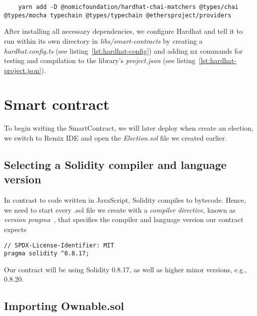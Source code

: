 \begin{verbatim}
    yarn add -D @nomicfoundation/hardhat-chai-matchers @types/chai @types/mocha typechain @types/typechain @ethersproject/providers
\end{verbatim}

After installing all necessary dependencies, we configure Hardhat and tell it to run within its own directory in \emph{libs/smart-contracts} by creating a \emph{hardhat.config.ts} (see listing~\ref{lst:hardhat-config}) and adding nx commands for testing and compilation to the library's \emph{project.json} (see listing~\ref{lst:hardhat-project.json}).


\section{Smart contract}\label{sec:smart-contract}

To begin writing the \gls{SmartContract}, we will later deploy when  create an election, we switch to Remix \gls{IDE} and open the \emph{Election.sol} file we created earlier.

\subsection{Selecting a Solidity compiler and language version}\label{subsec:selecting-a-solidity-compiler-and-language-version}

In contrast to code written in JavaScript, Solidity compiles to bytecode.
Hence, we need to start every .sol file we create with a \emph{compiler directive}, known as \emph{version pragma}~\autocite[135]{antonopoulos_mastering_2019}, that specifies the compiler and language version our contract expects

\begin{verbatim}
// SPDX-License-Identifier: MIT
pragma solidity ^0.8.17;
\end{verbatim}

Our contract will be using Solidity 0.8.17, as well as higher minor versions, e.g., 0.8.20.

\subsection{Importing Ownable.sol}\label{subsec:impotring-ownable.sol}

